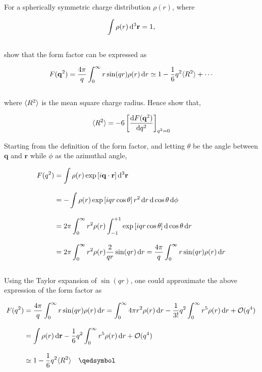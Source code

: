 
\begin{problem}{7.4} 
    For a spherically symmetric charge distribution $\rho(r)$, where

    \begin{align*}
        \int \rho(r) \mathop{}\!\mathrm{d}^3 \mathbf{r} = 1,
    \end{align*}\\
    show that the form factor can be expressed as

    \begin{align*}
        F(\mathbf{q}^2) = \frac{4\pi}{q} \int^\infty_0 r \sin(qr) \rho(r) \mathop{}\!\mathrm{d} r \simeq 1 -\frac{1}{6}q^2\langle R^2 \rangle + \cdots
    \end{align*}\\
    where $\langle R^2 \rangle$  is the mean square charge radius. Hence show that,

    \begin{align*}
        \langle R^2 \rangle = -6 \left[ \frac{\mathop{}\!\mathrm{d} F(\mathbf{q}^2)}{\mathop{}\!\mathrm{d} q^2} \right]_{q^2=0}
    \end{align*}
\end{problem}
\begin{solution}
Starting from the definition of the form factor, and letting $\theta$ be the angle between $\mathbf{q}$ and $\mathbf{r}$ while $\phi$ as the azimuthal angle, 

\begin{align*}
    F(q^2) &= \int \rho(r) \exp\left[i\mathbf{q}\cdot\mathbf{r}\right] \dif^3 \mathbf{r} \\[0.12in]
           &= -\int \rho(r) \exp\left[ iqr\cos\theta \right]  r^2 \dif r \dif \cos\theta \dif \phi \\[0.12in]
           &=  2\pi \int_0^\infty r^2 \rho(r) \int_{-1}^{+1} \exp\left[ iqr\cos\theta \right] \dif \cos\theta    \dif r \\[0.12in]
           &= 2\pi \int_0^\infty r^2 \rho(r) \frac{2}{qr} \sin(qr) \dif r = \frac{4\pi}{q} \int^\infty_0 r \sin(qr) \rho(r) \dif r 
\end{align*}\\
Using the Taylor expansion of $\sin(qr)$, one could approximate the above expression of the form factor as 

\begin{align*}
    F(q^2) &=  \frac{4\pi}{q} \int^\infty_0 r \sin(qr) \rho(r) \dif r = \int_0^\infty 4\pi r^2 \rho(r) \dif r - \frac{1}{3!} q^2 \int_0^\infty r^5 \rho(r) \dif r + \mathcal{O}(q^4) \\[0.12in]
    &= \int \rho(r) \dif \mathbf{r} - \frac{1}{6} q^2 \int_0^\infty r^5 \rho(r) \dif r + \mathcal{O}(q^4)  \\[0.12in]
    &\simeq 1 - \frac{1}{6}q^2 \expval{R^2} \qed
\end{align*} 
\end{solution}

